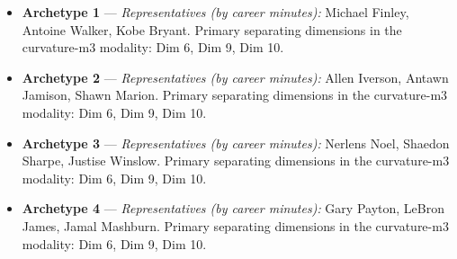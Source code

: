 \begin{itemize}
\item \textbf{Archetype 1} --- \emph{Representatives (by career minutes):} Michael Finley, Antoine Walker, Kobe Bryant. Primary separating dimensions in the curvature-m3 modality: Dim 6, Dim 9, Dim 10.
\item \textbf{Archetype 2} --- \emph{Representatives (by career minutes):} Allen Iverson, Antawn Jamison, Shawn Marion. Primary separating dimensions in the curvature-m3 modality: Dim 6, Dim 9, Dim 10.
\item \textbf{Archetype 3} --- \emph{Representatives (by career minutes):} Nerlens Noel, Shaedon Sharpe, Justise Winslow. Primary separating dimensions in the curvature-m3 modality: Dim 6, Dim 9, Dim 10.
\item \textbf{Archetype 4} --- \emph{Representatives (by career minutes):} Gary Payton, LeBron James, Jamal Mashburn. Primary separating dimensions in the curvature-m3 modality: Dim 6, Dim 9, Dim 10.
\end{itemize}

